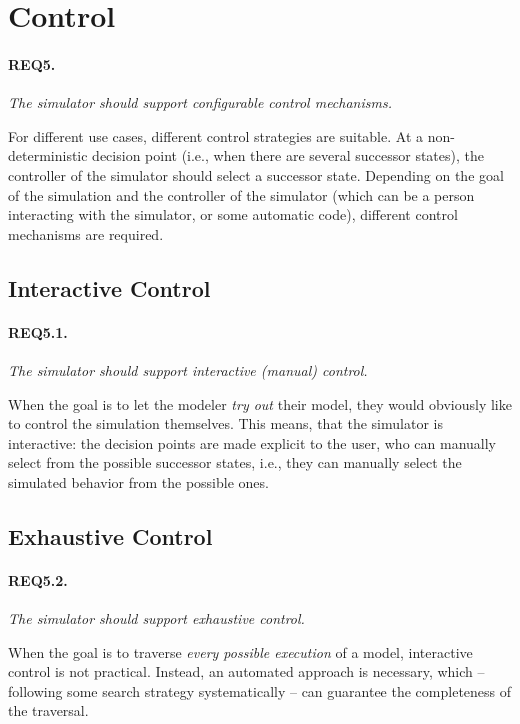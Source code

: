 \section{Control}\label{sec:req-control}

\paragraph{REQ5.} \textit{The simulator should support configurable control mechanisms.}

For different use cases, different control strategies are suitable. At a non-deterministic decision point (i.e., when there are several successor states), the controller of the simulator should select a successor state. Depending on the goal of the simulation and the controller of the simulator (which can be a person interacting with the simulator, or some automatic code), different control mechanisms are required.

\subsection{Interactive Control}

\paragraph{REQ5.1.} \textit{The simulator should support interactive (manual) control.}

When the goal is to let the modeler \textit{try out} their model, they would obviously like to control the simulation themselves. This means, that the simulator is interactive: the decision points are made explicit to the user, who can manually select from the possible successor states, i.e., they can manually select the simulated behavior from the possible ones.

\subsection{Exhaustive Control}

\paragraph{REQ5.2.} \textit{The simulator should support exhaustive control.}

When the goal is to traverse \textit{every possible execution} of a model, interactive control is not practical. Instead, an automated approach is necessary, which -- following some search strategy systematically -- can guarantee the completeness of the traversal.

